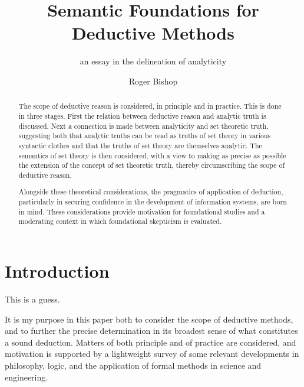 \documentclass{rbjk}
\begin{document}
                                                                                   
\begin{article}
\begin{opening}  
\title{Semantic Foundations for Deductive Methods}
\subtitle{an essay in the delineation of analyticity}
\author{Roger Bishop }

\begin{abstract}

The scope of deductive reason is considered, in principle and in practice.
This is done in three stages.
First the relation between deductive reason and analytic truth is discussed.
Next a connection is made between analyticity and set theoretic truth, suggesting both that analytic truths can be read as truths of set theory in various syntactic clothes and that the truths of set theory are themselves analytic.
The semantics of set theory is then considered, with a view to making as precise as possible the extension of the concept of set theoretic truth, thereby circumscribing the scope of deductive reason.

Alongside these theoretical considerations, the pragmatics of application of deduction, particularly in securing confidence in the development of information systems, are born in mind.
These considerations provide motivation for foundational studies and a moderating context in which foundational skepticism is evaluated.

\end{abstract}
\end{opening}

\section{Introduction}

\begin{guess}
This is a guess.
\end{guess}

It is my purpose in this paper both to consider the scope of deductive methods, and to further the precise determination in its broadest sense of what constitutes a sound deduction.
Matters of both principle and of practice are considered, and motivation is supported by a lightweight survey of some relevant developments in philosophy, logic, and the application of formal methods in science and engineering.
\cite{MacKensie}


\end{article}
\end{document}
